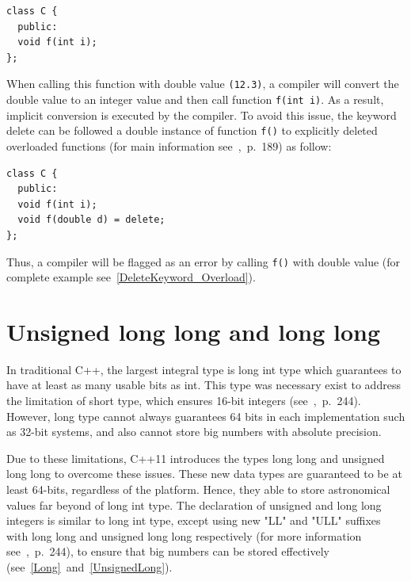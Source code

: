 \documentclass[11pt]{report}
\begin{document}
\begin{lstlisting}
class C {
  public:
  void f(int i);
};
\end{lstlisting}
 When calling this function with double value \texttt{(12.3)}, a compiler will convert the double value to an integer value and then call function \texttt{f(int i)}. As a result, implicit conversion is executed by the compiler. To avoid this issue, the keyword delete can be followed a double instance of function \texttt{f()} to explicitly deleted overloaded functions (for main information see~\cite{Gregorie:professionalcpp},~p.~189) as follow:
\begin{lstlisting}
class C {
  public:
  void f(int i);
  void f(double d) = delete;
};
\end{lstlisting}
Thus, a compiler will be flagged as an error by calling \texttt{f()} with double value (for complete example see~\ref{DeleteKeyword_Overload}).

\section{Unsigned long long and long long}
\label{section: Unsigned and long long (int)}
In traditional C++, the largest integral type is long int type which guarantees to have at least as many usable bits as int. This type was necessary exist to address the limitation of short type, which ensures 16-bit integers (see~\cite{Overland:2011:CWF},~p.~244). However, long type cannot always guarantees 64 bits in each implementation such as 32-bit systems, and also cannot store big numbers with absolute precision.

Due to these limitations, C++11 introduces the types long long and unsigned long long to overcome these issues. These new data types are guaranteed to be at least 64-bits, regardless of the platform. Hence, they able to store astronomical values far beyond of long int type. The declaration of unsigned and long long integers is similar to long int type, except using new "LL" and "ULL" suffixes with long long and unsigned long long respectively (for more information see~\cite{Overland:2011:CWF},~p.~244), to ensure that big numbers can be stored effectively (see~\ref{Long}~and~\ref{UnsignedLong}).

\end{document}
